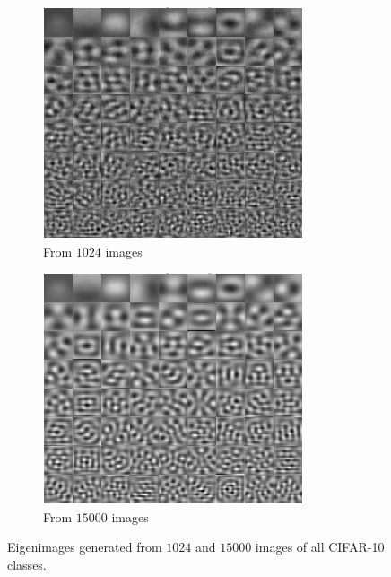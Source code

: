 \documentclass{article} %
\begin{document}
\begin{figure}[h]
\centering
\begin{subfigure}{.5\textwidth}
  \centering
  \includegraphics[width=.9\linewidth]{CIFAR10All1024Eigenimages}
  \caption{From $1024$ images}
  \label{fig:eigenImagesAll1024}
\end{subfigure}%
\begin{subfigure}{.5\textwidth}
  \centering
  \includegraphics[width=.9\linewidth]{CIFAR10All15000Eigenimages}
  \caption{From $15000$ images}
  \label{fig:eigenImagesAll15000}
\end{subfigure}
\caption{Eigenimages generated from $1024$ and $15000$ images of all CIFAR-10 classes.}
\label{fig:eigenImagesAll}
\end{figure}
\end{document}
